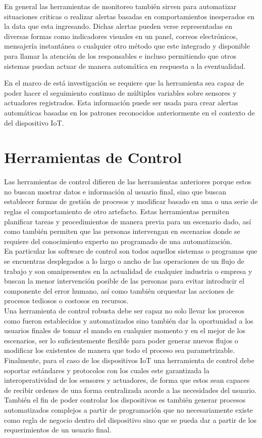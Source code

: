 En general las herramientas de monitoreo también sirven para automatizar situaciones criticas o realizar alertas basadas en comportamientos inesperados en la data que esta ingresando. Dichas alertas pueden verse representadas en diversas formas como indicadores visuales en un panel, correos electrónicos, mensajería instantánea o cualquier otro método que este integrado y disponible para llamar la atención de los responsables e incluso permitiendo que otros sistemas puedan actuar de manera automática en respuesta a la eventualidad. 

En el marco de está investigación se requiere que la herramienta sea capaz de poder hacer el seguimiento continuo de múltiples variables sobre sensores y actuadores registrados. Esta información puede ser usada para crear alertas automáticas basadas en los patrones reconocidos anteriormente en el contexto de del dispositivo IoT. 


\section{Herramientas de Control}
Las herramientas de control difieren de las herramientas anteriores porque estos no buscan mostrar datos e información al usuario final, sino que buscan establecer formas de gestión de procesos y modificar basado en una o una serie de reglas el comportamiento de otro artefacto. Estas herramientas permiten planificar tareas y procedimientos de manera previa para un escenario dado, así como también permiten que las personas intervengan en escenarios donde se requiere del conocimiento experto no programado de una automatización.\\

En particular los software de control son todos aquellos sistemas o programas que se encuentras desplegados a lo largo o ancho de las operaciones de un flujo de trabajo y son omnipresentes en la actualidad de cualquier industria o empresa y buscan la menor intervención posible de las personas para evitar introducir el componente del error humano, así como también orquestar las acciones de procesos tediosos o costosos en recursos.\\

Una herramienta de control robusta debe ser capaz no solo llevar los procesos como fueron establecidos y automatizados sino también dar la oportunidad a los usuarios finales de tomar el mando en cualquier momento y en el mejor de los escenarios, ser lo suficientemente flexible para poder generar nuevos flujos o modificar los existentes de manera que todo el proceso sea parametrizable.\\ 

Finalmente, para el caso de los dispositivos IoT una herramienta de control debe soportar estándares y protocolos con los cuales este garantizada la interoperatividad de los sensores y actuadores, de forma que estos sean capaces de recibir ordenes de una forma centralizada acorde a las necesidades del usuario. También el fin de poder controlar los dispositivos es también generar procesos automatizados complejos a partir de programación que no necesariamente existe como regla de negocio dentro del dispositivo sino que se pueda dar a partir de los requerimientos de un usuario final.  
